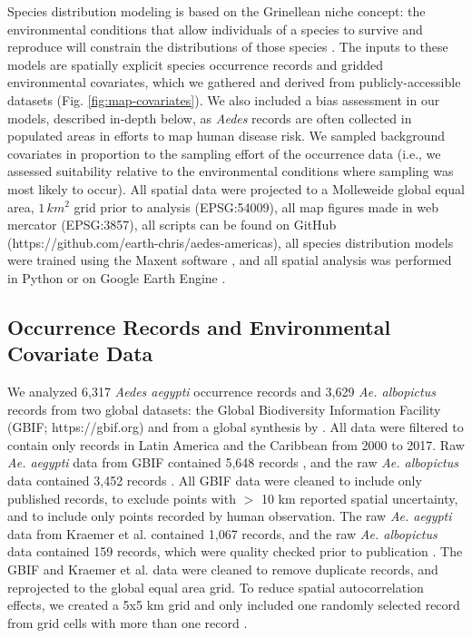 Species distribution modeling is based on the Grinellean niche concept: the environmental conditions that allow individuals of a species to survive and reproduce will constrain the distributions of those species \cite{Grinnell1917-aa, Wiens2009-sb}. The inputs to these models are spatially explicit species occurrence records and gridded environmental covariates, which we gathered and derived from publicly-accessible datasets (Fig. \ref{fig:map-covariates}). We also included a bias assessment in our models, described in-depth below, as \textit{Aedes} records are often collected in populated areas in efforts to map human disease risk. We sampled background covariates in proportion to the sampling effort of the occurrence data (i.e., we assessed suitability relative to the environmental conditions where sampling was most likely to occur). All spatial data were projected to a Molleweide global equal area, $1\, km^2$ grid prior to analysis (EPSG:54009), all map figures made in web mercator (EPSG:3857), all scripts can be found on GitHub (https://github.com/earth-chris/aedes-americas), all species distribution models were trained using the Maxent software \cite{Steven_J_Phillips_Miroslav_Dudik_Robert_E_Schapire_undated-nv}, and all spatial analysis was performed in Python or on Google Earth Engine \cite{Gorelick2017-nx}.

\subsection{Occurrence Records and Environmental Covariate Data}

We analyzed 6,317 \textit{Aedes aegypti} occurrence records and 3,629 \textit{Ae. albopictus} records from two global datasets: the Global Biodiversity Information Facility (GBIF; https://gbif.org) and from a global synthesis by \cite{Kraemer2015-sm}. All data were filtered to contain only records in Latin America and the Caribbean from 2000 to 2017. Raw \textit{Ae. aegypti} data from GBIF contained 5,648 records \cite{Gbif2018-ae}, and the raw \textit{Ae. albopictus} data contained 3,452 records \cite{Gbif2018-aa}. All GBIF data were cleaned to include only published records, to exclude points with $>$ 10 km reported spatial uncertainty, and to include only points recorded by human observation. The raw \textit{Ae. aegypti} data from Kraemer et al. contained 1,067 records, and the raw \textit{Ae. albopictus} data contained 159 records, which were quality checked prior to publication \cite{Kraemer2015-sm}. The GBIF and Kraemer et al. data were cleaned to remove duplicate records, and reprojected to the global equal area grid. To reduce spatial autocorrelation effects, we created a 5x5 km grid and only included one randomly selected record from grid cells with more than one record \cite{Segurado2006-gy, Hawkins2012-gu}.

